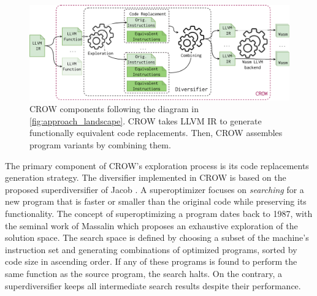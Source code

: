 
\begin{figure}[h]
    \includegraphics[width=\linewidth]{diagrams/generation/crow.drawio.pdf}
    \caption{CROW components following the diagram in \autoref{fig:approach_landscape}. CROW takes LLVM IR to generate functionally equivalent code replacements. Then, CROW assembles program variants by combining them.}
    \label{diagrams:crow}
\end{figure}




The primary component of CROW's exploration process is its code replacements generation strategy. The diversifier implemented in CROW is based on the proposed superdiversifier of Jacob \etal \cite{jacob2008superdiversifier}.
A superoptimizer focuses on \emph{searching} for a new program that is faster or smaller than the original code while preserving its functionality.
The concept of superoptimizing a program dates back to 1987, with the seminal work of Massalin \cite{Massalin1987} which proposes an exhaustive exploration of the solution space. The search space is defined by choosing a subset of the machine's instruction set and generating combinations of optimized programs, sorted by code size in ascending order. If any of these programs is found to perform the same function as the source program, the search halts. On the contrary, a superdiversifier keeps all intermediate search results despite their performance. 


